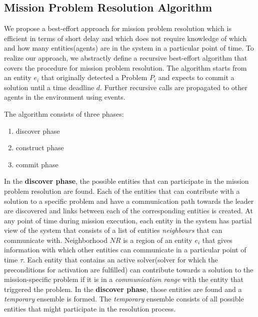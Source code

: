 \documentclass[journal]{IEEEtran}
\theoremstyle{definition}
\begin{document}
\subsection{Mission Problem Resolution Algorithm}









We propose a best-effort approach for mission problem resolution which is efficient in terms of short delay and which does not require knowledge of which and how many entities(agents) are in the system in a particular point of time.
To realize our approach, we abstractly define a recursive best-effort algorithm that covers the procedure for mission problem resolution.
The algorithm starts from an entity $e_i$ that originally detected a Problem $P_i$ and expects to commit a solution until a time deadline $d$.
Further recursive calls are propagated to other agents in the environment using events.

The algorithm consists of three phases:
\begin{enumerate}
\item discover phase 
\item construct phase
\item commit phase
\end{enumerate}
 
 In the \textbf{discover phase},  %
 the possible entities that can participate in the mission problem resolution are found. Each of the entities that can contribute with a solution to a specific problem and have a communication path towards 
 the leader are discovered and links between each of the corresponding entities is created. 
 At any point of time during mission execution, each entity in the system has partial view of the system that consists of a list of entities \textit{neighbours} that can communicate with. Neighborhood $NR$ is a region of an entity $e_i$ that gives information with which other entities can communicate in a particular point of time $\tau$.
 Each entity that contains an active solver(solver for which the preconditions for activation are fulfilled) %
 can contribute towards a solution to the mission-specific problem if it is in a \textit{communication range} with the entity that triggered the problem. In the \textbf{discover phase}, those entities are found
 and a \textit{temporary} ensemble is formed. The \textit{temporary} ensemble consists of all possible entities that might participate in the resolution process.
 
\end{document}
